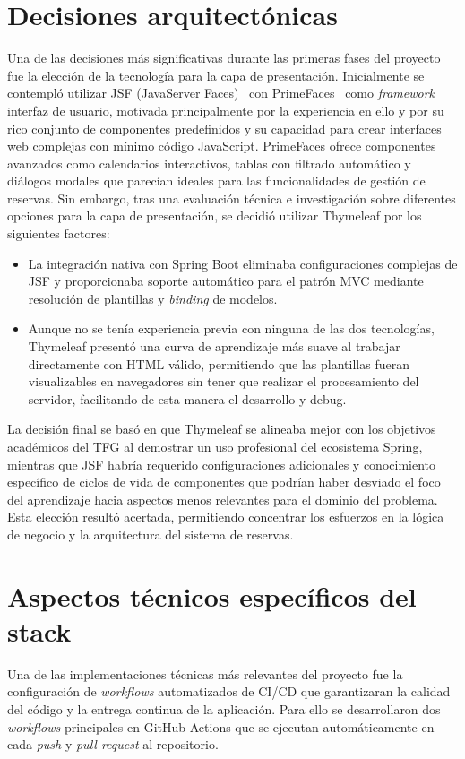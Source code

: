 \section{Decisiones arquitectónicas}\label{decisiones-arquitectonicas}
Una de las decisiones más significativas durante las primeras fases del proyecto fue la elección de la tecnología para la capa de presentación. Inicialmente se contempló utilizar JSF (JavaServer Faces)~\cite{jsf} con PrimeFaces~\cite{primefaces} como \emph{framework} interfaz de usuario, motivada principalmente por la experiencia en ello y por su rico conjunto de componentes predefinidos y su capacidad para crear interfaces web complejas con mínimo código JavaScript. PrimeFaces ofrece componentes avanzados como calendarios interactivos, tablas con filtrado automático y diálogos modales que parecían ideales para las funcionalidades de gestión de reservas. Sin embargo, tras una evaluación técnica e investigación sobre diferentes opciones para la capa de presentación, se decidió utilizar Thymeleaf por los siguientes factores:

\begin{itemize}
\tightlist
\item
La integración nativa con Spring Boot eliminaba configuraciones complejas de JSF y proporcionaba soporte automático para el patrón MVC mediante resolución de plantillas y \emph{binding} de modelos.
\item
Aunque no se tenía experiencia previa con ninguna de las dos tecnologías, Thymeleaf presentó una curva de aprendizaje más suave al trabajar directamente con HTML válido, permitiendo que las plantillas fueran visualizables en navegadores sin tener que realizar el procesamiento del servidor, facilitando de esta manera el desarrollo y debug.
\end{itemize}

La decisión final se basó en que Thymeleaf se alineaba mejor con los objetivos académicos del TFG al demostrar un uso profesional del ecosistema Spring, mientras que JSF habría requerido configuraciones adicionales y conocimiento específico de ciclos de vida de componentes que podrían haber desviado el foco del aprendizaje hacia aspectos menos relevantes para el dominio del problema. Esta elección resultó acertada, permitiendo concentrar los esfuerzos en la lógica de negocio y la arquitectura del sistema de reservas.

\section{Aspectos técnicos específicos del stack}\label{aspectos-terncicos-del-stack}
Una de las implementaciones técnicas más relevantes del proyecto fue la configuración de \emph{workflows} automatizados de CI/CD que garantizaran la calidad del código y la entrega continua de la aplicación. Para ello se desarrollaron dos \emph{workflows} principales en GitHub Actions que se ejecutan automáticamente en cada \emph{push} y \emph{pull request} al repositorio.

